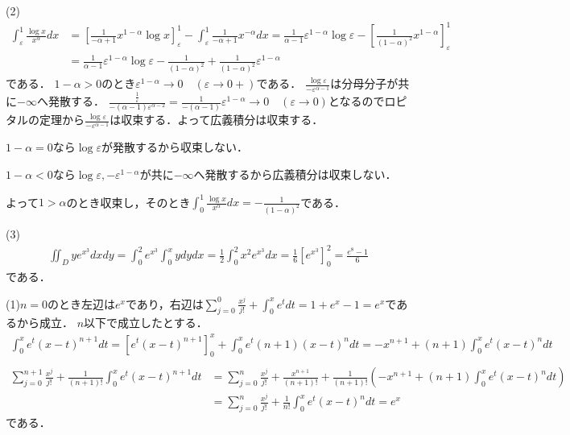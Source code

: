 \documentclass[
		book,
		head_space=20mm,
		foot_space=20mm,
		gutter=10mm,
		line_length=190mm
]{jlreq}
\begin{document}
	(2)\begin{align}
		\int_{\varepsilon}^1 \frac{\log x}{x^\alpha}dx&=\left[ \frac{1}{-\alpha+1}x^{1-\alpha}\log x \right]_\varepsilon^1 -\int_{\varepsilon}^1 \frac{1}{-\alpha+1}x^{-\alpha}dx=\frac{1}{\alpha-1}\varepsilon^{1-\alpha}\log \varepsilon -\left[ \frac{1}{(1-\alpha)^2}x^{1-\alpha} \right]_{\varepsilon}^1\\&=\frac{1}{\alpha-1}\varepsilon^{1-\alpha}\log \varepsilon -\frac{1}{(1-\alpha)^2}+\frac{1}{(1-\alpha)^2}\varepsilon^{1-\alpha}
	\end{align}
	である．
	$1-\alpha>0$のとき$\varepsilon^{1-\alpha}\rightarrow 0\quad(\varepsilon\rightarrow 0+)$である．
	$\frac{\log \varepsilon}{-\varepsilon^{\alpha-1}}$は分母分子が共に$-\infty$へ発散する．
	$\frac{\frac{1}{\varepsilon}}{-(\alpha-1)\varepsilon^{\alpha-2}}=\frac{1}{-(\alpha-1)}\varepsilon^{1-\alpha}\rightarrow 0\quad(\varepsilon\rightarrow 0)$となるのでロピタルの定理から$\frac{\log \varepsilon}{-\varepsilon^{\alpha-1}}$は収束する．よって広義積分は収束する．

	$1-\alpha=0$なら$\log \varepsilon$が発散するから収束しない．

	$1-\alpha<0$なら$\log \varepsilon,-\varepsilon^{1-\alpha}$が共に$-\infty$へ発散するから広義積分は収束しない．

	よって$1>\alpha$のとき収束し，そのとき$\int_0^1 \frac{\log x}{x^\alpha}dx=-\frac{1}{(1-\alpha)^2}$である．

	(3)\begin{align}
		\iint_D ye^{x^3}dxdy=\int_0^2e^{x^3}\int_0^x ydydx=\frac{1}{2}\int_0^2x^2e^{x^3}dx=\frac{1}{6}\left[ e^{x^3} \right]_0^2=\frac{e^8-1}{6}
	\end{align}である．

	(1)$n=0$のとき左辺は$e^x$であり，右辺は$\sum\limits_{j=0}^0 \frac{x^j}{j!}+\int_0^xe^tdt=1+e^x-1=e^x$であるから成立．
	$n$以下で成立したとする．
	\begin{align}
		\int_0^xe^t(x-t)^{n+1}dt=\left[ e^t(x-t)^{n+1} \right]_0^x+\int_0^x e^t (n+1)(x-t)^ndt=-x^{n+1}+(n+1)\int_0^x e^t(x-t)^ndt\\
	\end{align}
	\begin{align}
		\sum_{j=0}^{n+1}\frac{x^j}{j!}+\frac{1}{(n+1)!}\int_0^xe^t(x-t)^{n+1}dt&=\sum_{j=0}^{n}\frac{x^j}{j!}+\frac{x^{n+1}}{(n+1)!}+\frac{1}{(n+1)!}\left( -x^{n+1}+(n+1)\int_0^x e^t(x-t)^ndt \right)\\
		 &=\sum_{j=0}^{n}\frac{x^j}{j!}+\frac{1}{n!}\int_0^xe^t(x-t)^{n}dt=e^x
	\end{align}
	である．
\end{document}
